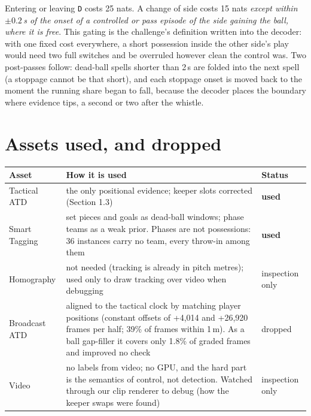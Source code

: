 \documentclass[11pt,a4paper]{article}
\newcommand{\code}[1]{\texttt{#1}}
\newcommand{\st}[1]{\textbf{#1}}
\begin{document}
Entering or leaving \code{D} costs 25 nats. A change of side costs 15 nats \emph{except within
$\pm0.2$\,s of the onset of a controlled or pass episode of the side gaining the ball, where it is
free}. This gating is the challenge's definition written into the decoder: with one fixed cost
everywhere, a short possession inside the other side's play would need two full switches and be
overruled however clean the control was. Two post-passes follow: dead-ball spells shorter than
2\,s are folded into the next spell (a stoppage cannot be that short), and each stoppage onset is
moved back to the moment the running share began to fall, because the decoder places the boundary
where evidence tips, a second or two after the whistle.

\section{Assets used, and dropped}

\begin{center}\small
\begin{tabularx}{\linewidth}{@{}l L l@{}}
\toprule
\st{Asset} & \st{How it is used} & \st{Status} \\
\midrule
Tactical ATD & the only positional evidence; keeper slots corrected (Section 1.3) & \textbf{used} \\
Smart Tagging & set pieces and goals as dead-ball windows; phase teams as a weak prior. Phases are not
possessions: 36 instances carry no team, every throw-in among them & \textbf{used} \\
Homography & not needed (tracking is already in pitch metres); used only to draw tracking over video when debugging & inspection only \\
Broadcast ATD & aligned to the tactical clock by matching player positions (constant offsets of
+4,014 and +26,920 frames per half; 39\% of frames within 1\,m). As a ball gap-filler it covers
only 1.8\% of graded frames and improved no check & dropped \\
Video & no labels from video; no GPU, and the hard part is the semantics of control, not detection.
Watched through our clip renderer to debug (how the keeper swaps were found) & inspection only \\
\bottomrule
\end{tabularx}
\end{center}

\end{document}
